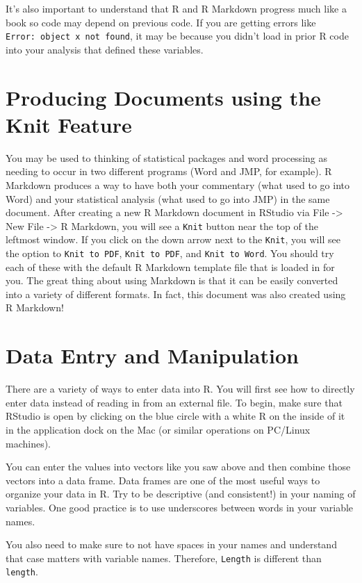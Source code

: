 \documentclass[twoside, 12pt]{article}
\newcommand{\nonumsection}[1]{
  \addtocontents{toc}{\protect\setcounter{tocdepth}{-1}}
  \section{#1}
  \addtocontents{toc}{\protect\setcounter{tocdepth}{1}}
}
\begin{document}
It's also important to understand that R and R Markdown progress much
like a book so code may depend on previous code. If you are getting
errors like
\texttt{Error:\ object\ \textquotesingle{}x\textquotesingle{}\ not\ found},
it may be because you didn't load in prior R code into your analysis
that defined these variables.

\nonumsection{Producing Documents using the Knit Feature}

You may be used to thinking of statistical packages and word processing
as needing to occur in two different programs (Word and JMP, for
example). R Markdown produces a way to have both your commentary (what
used to go into Word) and your statistical analysis (what used to go
into JMP) in the same document. After creating a new R Markdown document
in RStudio via File -\textgreater{} New File -\textgreater{} R Markdown,
you will see a \texttt{Knit} button near the top of the leftmost window.
If you click on the down arrow next to the \texttt{Knit}, you will see
the option to \texttt{Knit\ to\ PDF}, \texttt{Knit\ to\ PDF}, and
\texttt{Knit\ to\ Word}. You should try each of these with the default R
Markdown template file that is loaded in for you. The great thing about
using Markdown is that it can be easily converted into a variety of
different formats. In fact, this document was also created using R
Markdown!

\section{Data Entry and Manipulation}\label{data-entry-and-manipulation}

There are a variety of ways to enter data into R. You will first see how
to directly enter data instead of reading in from an external file. To
begin, make sure that RStudio is open by clicking on the blue circle
with a white R on the inside of it in the application dock on the Mac
(or similar operations on PC/Linux machines).

You can enter the values into vectors like you saw above and then
combine those vectors into a data frame. Data frames are one of the most
useful ways to organize your data in R. Try to be descriptive (and
consistent!) in your naming of variables. One good practice is to use
underscores between words in your variable names.

You also need to make sure to not have spaces in your names and
understand that case matters with variable names. Therefore,
\texttt{Length} is different than \texttt{length}.
\end{document}
